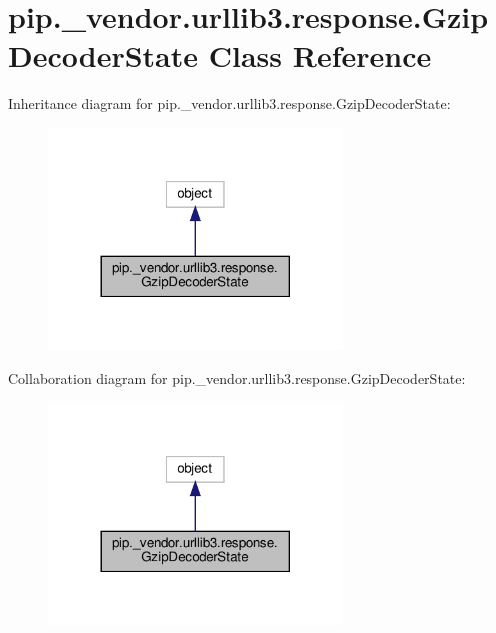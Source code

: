 \hypertarget{classpip_1_1__vendor_1_1urllib3_1_1response_1_1GzipDecoderState}{}\section{pip.\+\_\+vendor.\+urllib3.\+response.\+Gzip\+Decoder\+State Class Reference}
\label{classpip_1_1__vendor_1_1urllib3_1_1response_1_1GzipDecoderState}


Inheritance diagram for pip.\+\_\+vendor.\+urllib3.\+response.\+Gzip\+Decoder\+State\+:
\nopagebreak
\begin{figure}[H]
\begin{center}
\leavevmode
\includegraphics[width=221pt]{classpip_1_1__vendor_1_1urllib3_1_1response_1_1GzipDecoderState__inherit__graph}
\end{center}
\end{figure}


Collaboration diagram for pip.\+\_\+vendor.\+urllib3.\+response.\+Gzip\+Decoder\+State\+:
\nopagebreak
\begin{figure}[H]
\begin{center}
\leavevmode
\includegraphics[width=221pt]{classpip_1_1__vendor_1_1urllib3_1_1response_1_1GzipDecoderState__coll__graph}
\end{center}
\end{figure}
